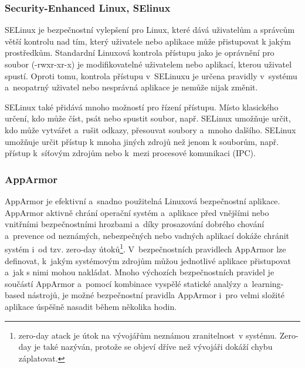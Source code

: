 \documentclass[a4paper,12pt]{article}
\begin{document}
\subsubsection{Security-Enhanced Linux, SElinux}

SELinux je bezpečnostní vylepšení pro Linux, které dává uživatelům a správcům větší kontrolu nad tím, který uživatele nebo aplikace může přistupovat k jakým prostředkům. Standardní Linuxová kontrola přístupu jako je oprávnění pro soubor (-rwxr-xr-x) je modifikovatelné uživatelem nebo aplikací, kterou uživatel spustí. Oproti tomu, kontrola přístupu v~SELinuxu je určena pravidly v~systému a~neopatrný uživatel nebo nesprávná aplikace je nemůže nijak změnit.

SELinux také přidává mnoho možností pro řízení přístupu. Místo klasického určení, kdo může číst, psát nebo spustit soubor, např. SELinux umožňuje určit, kdo může vytvářet a~rušit odkazy, přesouvat soubory a~mnoho dalšího. SELinux umožňuje určit přístup k mnoha jiných zdrojů než jenom k souborům, např. přístup k~síťovým zdrojům nebo k~mezi procesové komunikaci (IPC).\cite{SElinuxWiki}


\subsubsection{AppArmor}
AppArmor je efektivní a~snadno použitelná Linuxová bezpečnostní aplikace. AppArmor aktivně chrání operační systém a~aplikace před vnějšími nebo vnitřními bezpečnostními hrozbami a~díky prosazování dobrého chování a~prevence od neznámých, nebezpečných nebo vadných aplikací dokáže chránit systém i~od tzv. zero-day útoků\footnote{zero-day atack je útok na vývojářům neznámou zranitelnost~v systému. Zero-day je také nazýván, protože se objeví dříve než vývojáři dokáží chybu záplatovat.}. V~bezpečnostních pravidlech AppArmor lze definovat, k~jakým systémovým zdrojům můžou jednotlivé aplikace přistupovat a~jak s nimi mohou nakládat. Mnoho výchozích bezpečnostních pravidel je součástí AppArmor a~pomocí kombinace vyspělé statické analýzy a~learning-based nástrojů, je možné bezpečnostní pravidla AppArmor i~pro velmi složité aplikace úspěšně nasadit během několika hodin.\cite{AppArmorWikiMain}
\end{document}
